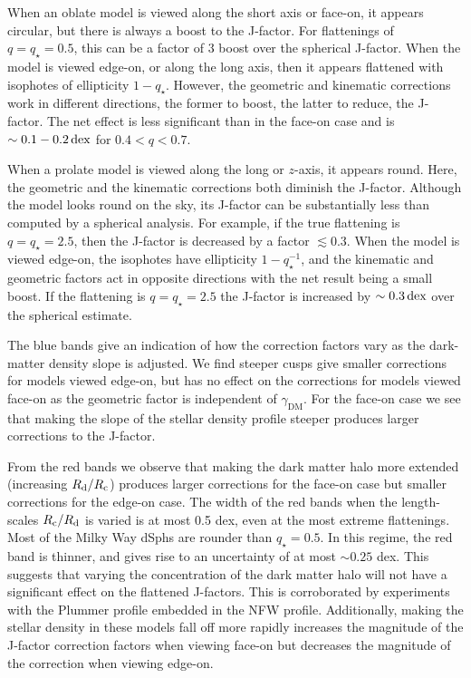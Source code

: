 \documentclass[prd,twocolumn,showpacs,preprintnumbers,superscriptaddress,nofootinbib,amsmath,amssymb,nobalancelastpage]{revtex4}
\def\rd{R_{\rm d}}
\def\dex{\,{\rm dex}}
\def\Rd{{R_{\rm d}}}
\def\Rc{{R_{\rm c}}}
\begin{document}
When an oblate model is viewed along the short axis or face-on, it
appears circular, but there is always a boost to the J-factor. For
flattenings of $q = q_\star = 0.5$, this can be a factor of $3$ boost over the spherical J-factor.  When the model is viewed
edge-on, or along the long axis, then it appears flattened with
isophotes of ellipticity $1-q_\star$.  However, the geometric and
kinematic corrections work in different directions, the former to
boost, the latter to reduce, the J-factor. The net effect is less significant than in the face-on case and is $\sim0.1-0.2\dex$ for $0.4<q<0.7$.

When a prolate model is viewed along the long or $z$-axis, it appears
round. Here, the geometric and the kinematic corrections both diminish
the J-factor. Although the model looks round on the sky, its J-factor
can be substantially less than computed by a spherical analysis. For
example, if the true flattening is $q = q_\star = 2.5$, then the
J-factor is decreased by a factor $\lesssim 0.3$. When the model is
viewed edge-on, the isophotes have ellipticity $1-q_\star^{-1}$, and the kinematic and geometric factors act in opposite directions with the net result being a small boost. If the flattening is $q = q_\star = 2.5$ the J-factor is increased by $\sim 0.3\dex$ over the spherical estimate.

The blue bands give an indication of how the correction factors vary as the dark-matter density slope is adjusted. We find steeper cusps give smaller corrections for models viewed edge-on, but has no effect on the corrections for models viewed face-on as the geometric factor is independent of $\gamma_\mathrm{DM}$. For the face-on case we see that making the slope of the stellar density profile steeper produces larger corrections to the J-factor.

From the red bands we observe that making the dark matter halo more extended (increasing $\rd/\Rc$) produces larger corrections for the face-on case but smaller corrections for the edge-on case. The width of the red bands when the length-scales $\Rc/\Rd$ is varied
is at most 0.5 dex, even at the most extreme flattenings. Most of the
Milky Way dSphs are rounder than $q_\star = 0.5$. In this regime, the
red band is thinner, and gives rise to an uncertainty of at most $\sim
0.25$ dex. This suggests that varying the concentration of the dark
matter halo will not have a significant effect on the flattened
J-factors. This is corroborated by experiments with the Plummer profile embedded in the NFW profile. Additionally, making the stellar density in these models fall off more rapidly increases the magnitude of the J-factor correction factors when viewing face-on but decreases the magnitude of the correction when viewing edge-on.
\end{document}
